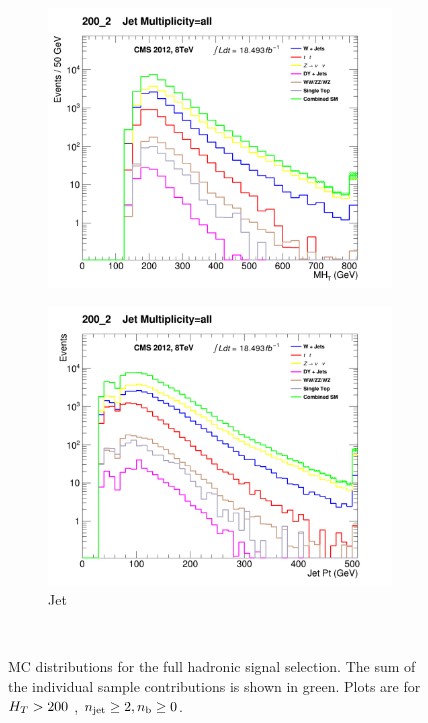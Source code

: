 \begin{figure}[!ht]
    \begin{subfigure}[b]{0.48\textwidth}
      \includegraphics[width=\textwidth]{Figs/datamc/had/v1/MHT_all_200_upwards}
      \caption{\mht}
    \end{subfigure}
    \begin{subfigure}[b]{0.48\textwidth}
      \includegraphics[width=\textwidth]{Figs/datamc/had/v1/CommonJetPt_all_200_upwards}
      \caption{Jet \Pt}
    \end{subfigure} \\
    \caption{\label{fig:datamc_had_inc}
    MC distributions for the full hadronic signal selection. The 
    sum of the individual sample contributions is shown in green. Plots
    are for $H_T>200$ \gev, $n_{\text{jet}}\geq2, n_{\text{b}}\geq0$.
    }
\end{figure}

